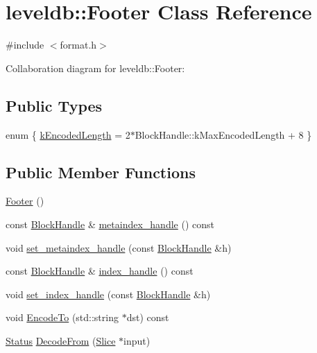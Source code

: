 \hypertarget{classleveldb_1_1_footer}{\section{leveldb\-:\-:Footer Class Reference}
\label{classleveldb_1_1_footer}
}


{\ttfamily \#include $<$format.\-h$>$}



Collaboration diagram for leveldb\-:\-:Footer\-:
\subsection*{Public Types}
\begin{DoxyCompactItemize}
\item 
enum \{ \hyperlink{classleveldb_1_1_footer_a991d6146eb5c455db47f91e378cf489ba52c5b622f817edcfaf2bb274851a3791}{k\-Encoded\-Length} = 2$\ast$\-Block\-Handle\-:\-:k\-Max\-Encoded\-Length + 8
 \}
\end{DoxyCompactItemize}
\subsection*{Public Member Functions}
\begin{DoxyCompactItemize}
\item 
\hyperlink{classleveldb_1_1_footer_ab549912506721bad11eda55be5a04a82}{Footer} ()
\item 
const \hyperlink{classleveldb_1_1_block_handle}{Block\-Handle} \& \hyperlink{classleveldb_1_1_footer_a44f2334ed064f7045d76b898f5fadb6a}{metaindex\-\_\-handle} () const 
\item 
void \hyperlink{classleveldb_1_1_footer_ac937207010f61550c703b2d732422566}{set\-\_\-metaindex\-\_\-handle} (const \hyperlink{classleveldb_1_1_block_handle}{Block\-Handle} \&h)
\item 
const \hyperlink{classleveldb_1_1_block_handle}{Block\-Handle} \& \hyperlink{classleveldb_1_1_footer_aae1a72a668da9eae3fa2f6620e3ea559}{index\-\_\-handle} () const 
\item 
void \hyperlink{classleveldb_1_1_footer_ae2f4be5947f5e4983a160d6d01edea68}{set\-\_\-index\-\_\-handle} (const \hyperlink{classleveldb_1_1_block_handle}{Block\-Handle} \&h)
\item 
void \hyperlink{classleveldb_1_1_footer_ac0148e441c2f25d7d24ec14ba2099f58}{Encode\-To} (std\-::string $\ast$dst) const 
\item 
\hyperlink{classleveldb_1_1_status}{Status} \hyperlink{classleveldb_1_1_footer_a3cbcb311694e4cf410358f97d53d94e3}{Decode\-From} (\hyperlink{classleveldb_1_1_slice}{Slice} $\ast$input)
\end{DoxyCompactItemize}
